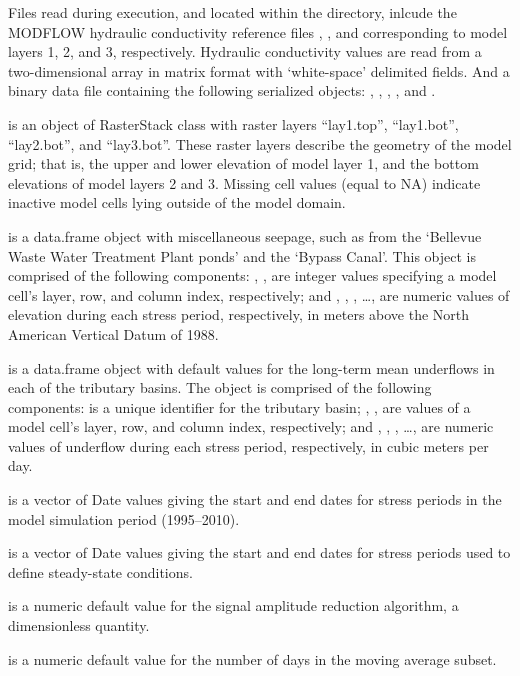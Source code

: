 \documentclass[a4paper]{book}
\begin{document}
%
\begin{Details}\relax
Files read during execution, and located within the  directory,
inlcude the MODFLOW hydraulic conductivity reference files ,
, and  corresponding to model layers 1, 2, and 3, respectively.
Hydraulic conductivity values are read from a two-dimensional array in
matrix format with `white-space' delimited fields.
And a binary data file  containing the following serialized \R{} objects:
, , , , and .

 is an object of RasterStack class with raster layers ``lay1.top'',
``lay1.bot'', ``lay2.bot'', and ``lay3.bot''.
These raster layers describe the geometry of the model grid; that is,
the upper and lower elevation of model layer 1, and the bottom elevations of model layers 2 and 3.
Missing cell values (equal to NA) indicate inactive model cells lying outside of the model domain.

 is a data.frame object with miscellaneous seepage,
such as from the `Bellevue Waste Water Treatment Plant ponds' and the `Bypass Canal'.
This object is comprised of the following components:
, ,  are integer values specifying a
model cell's layer, row, and column index, respectively; and
, , , \dots,  are numeric values of
elevation during each stress period, respectively,
in meters above the North American Vertical Datum of 1988.

 is a data.frame object with default values for the
long-term mean underflows in each of the tributary basins.
The object is comprised of the following components:
 is a unique identifier for the tributary basin;
, ,  are  values of a
model cell's layer, row, and column index, respectively; and
, , , \dots,  are numeric values of
underflow during each stress period, respectively, in cubic meters per day.

 is a vector of Date values giving the start and end dates for
stress periods in the model simulation period (1995--2010).

 is a vector of Date values giving the start and end dates for
stress periods used to define steady-state conditions.

 is a numeric default value for the signal amplitude reduction algorithm,
a dimensionless quantity.

 is a numeric default value for the number of days in the
moving average subset.
\end{Details}
\end{document}
